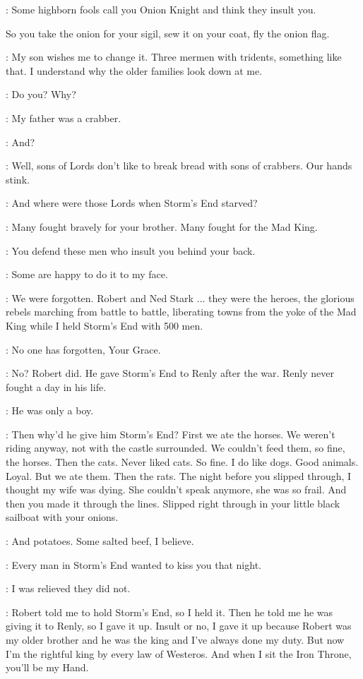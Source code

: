 \STANNIS: Some highborn fools call you Onion Knight and think they insult you. 

So you take the onion for your sigil, sew it on your coat, fly the onion flag. 

\DAVOS: My son wishes me to change it. Three mermen with tridents, something like that. I understand why the older families look down at me. 

\STANNIS: Do you? Why? 

\DAVOS: My father was a crabber. 

\STANNIS: And? 

\DAVOS: Well, sons of Lords don't like to break bread with sons of crabbers. Our hands stink. 

\STANNIS: And where were those Lords when Storm's End starved? 

\DAVOS: Many fought bravely for your brother. Many fought for the Mad King. 

\STANNIS: You defend these men who insult you behind your back. 

\DAVOS: Some are happy to do it to my face. 

\STANNIS: We were forgotten. Robert and Ned Stark $\ldots$ they were the heroes, the glorious rebels marching from battle to battle, liberating towns from the yoke of the Mad King while I held Storm's End with 500 men. 

\DAVOS: No one has forgotten, Your Grace. 

\STANNIS: No? Robert did. He gave Storm's End to Renly after the war. Renly never fought a day in his life. 

\DAVOS: He was only a boy. 

\STANNIS: Then why'd he give him Storm's End? First we ate the horses. We weren't riding anyway, not with the castle surrounded. We couldn't feed them, so fine, the horses. Then the cats. Never liked cats. So fine. I do like dogs. Good animals. Loyal. But we ate them. Then the rats. The night before you slipped through, I thought my wife was dying. She couldn't speak anymore, she was so frail. And then you made it through the lines. Slipped right through in your little black sailboat with your onions. 

\DAVOS: And potatoes. Some salted beef, I believe. 

\STANNIS: Every man in Storm's End wanted to kiss you that night. 

\DAVOS: I was relieved they did not. 

\STANNIS: Robert told me to hold Storm's End, so I held it. Then he told me he was giving it to Renly, so I gave it up. 
Insult or no, I gave it up because Robert was my older brother and he was the king and I've always done my duty. But now I'm the rightful king by every law of Westeros. And when I sit the Iron Throne, you'll be my Hand. 

